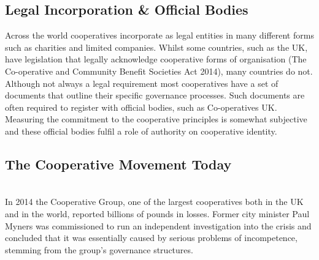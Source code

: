 \subsection{Legal Incorporation \& Official Bodies}
Across the world cooperatives incorporate as legal entities in many different forms such as charities and limited companies. Whilst some countries, such as the UK, have legislation that legally acknowledge cooperative forms of organisation (The Co-operative and Community Benefit Societies Act 2014\cite{CoopAct}), many countries do not.\\

Although not always a legal requirement most cooperatives have a set of documents that outline their specific governance processes. Such documents are often required to register with official bodies, such as Co-operatives UK\cite{CoopsUK}. Measuring the commitment to the cooperative principles is somewhat subjective and these official bodies fulfil a role of authority on cooperative identity.

\subsection{The Cooperative Movement Today}
\\
In 2014 the Cooperative Group, one of the largest cooperatives both in the UK and in the world, reported billions of pounds in losses. Former city minister Paul Myners was commissioned to run an independent investigation into the crisis and concluded that it was essentially caused by serious problems of incompetence, stemming from the group's governance structures. \\

